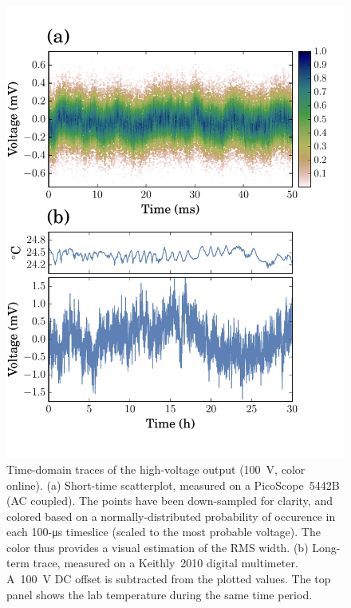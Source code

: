 \documentclass[aip,rsi,reprint]{revtex4-1} %
\begin{document}
\begin{figure}[b]
\includegraphics[width=\columnwidth]{TimeDomain}
\caption{Time-domain traces of the high-voltage output (\SI{100}{\volt}, color online). (a) Short-time scatterplot, measured on a PicoScope~5442B (AC coupled).
The points have been down-sampled for clarity, and colored based on a normally-distributed probability of occurence in each 100-\si{\micro\second} timeslice (scaled to the most probable voltage).
The color thus provides a visual estimation of the RMS width.
(b) Long-term trace, measured on a Keithly~2010 digital multimeter. A~\SI{100}{\volt} DC offset is subtracted from the plotted values. The top panel shows the lab temperature during the same time period.\label{Fig:TimeDomain}}
\end{figure}
 
\end{document}
